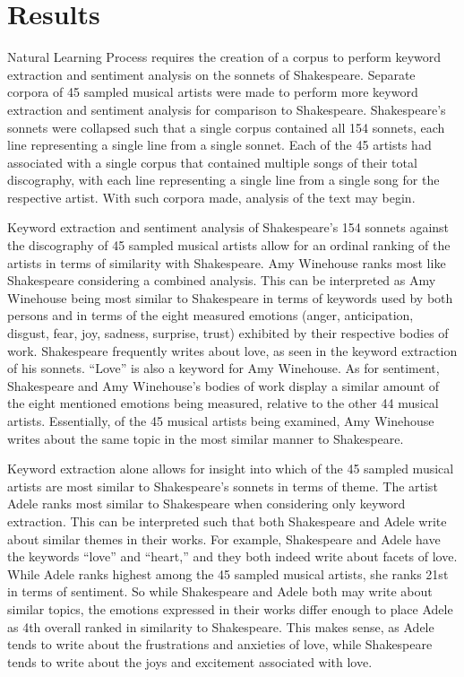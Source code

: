 \documentclass[10pt,a4paper]{article}
\begin{document}
\section{Results}
Natural Learning Process requires the creation of a corpus to perform keyword extraction and sentiment analysis on the sonnets of Shakespeare. Separate corpora of 45 sampled musical artists were made to perform more keyword extraction and sentiment analysis for comparison to Shakespeare. Shakespeare’s sonnets were collapsed such that a single corpus contained all 154 sonnets, each line representing a single line from a single sonnet. Each of the 45 artists had associated with a single corpus that contained multiple songs of their total discography, with each line representing a single line from a single song for the respective artist. With such corpora made, analysis of the text may begin.

\noindent Keyword extraction and sentiment analysis of Shakespeare’s 154 sonnets against the discography of 45 sampled musical artists allow for an ordinal ranking of the artists in terms of similarity with Shakespeare. Amy Winehouse ranks most like Shakespeare considering a combined analysis. This can be interpreted as Amy Winehouse being most similar to Shakespeare in terms of keywords used by both persons and in terms of the eight measured emotions (anger, anticipation, disgust, fear, joy, sadness, surprise, trust) exhibited by their respective bodies of work. Shakespeare frequently writes about love, as seen in the keyword extraction of his sonnets. “Love” is also a keyword for Amy Winehouse. As for sentiment, Shakespeare and Amy Winehouse’s bodies of work display a similar amount of the eight mentioned emotions being measured, relative to the other 44 musical artists. Essentially, of the 45 musical artists being examined, Amy Winehouse writes about the same topic in the most similar manner to Shakespeare.




\noindent Keyword extraction alone allows for insight into which of the 45 sampled musical artists are most similar to Shakespeare’s sonnets in terms of theme. The artist Adele ranks most similar to Shakespeare when considering only keyword extraction. This can be interpreted such that both Shakespeare and Adele write about similar themes in their works. For example, Shakespeare and Adele have the keywords “love” and “heart,” and they both indeed write about facets of love. While Adele ranks highest among the 45 sampled musical artists, she ranks 21st in terms of sentiment. So while Shakespeare and Adele both may write about similar topics, the emotions expressed in their works differ enough to place Adele as 4th overall ranked in similarity to Shakespeare. This makes sense, as Adele tends to write about the frustrations and anxieties of love, while Shakespeare tends to write about the joys and excitement associated with love. 
\end{document}
